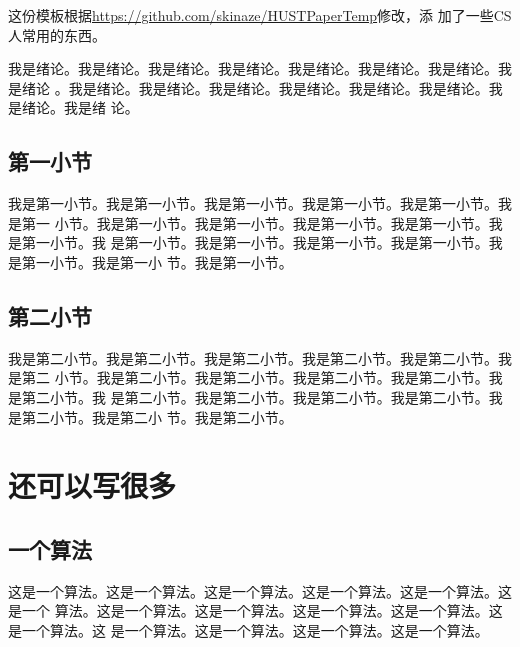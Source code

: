 \documentclass[supercite]{HustMasterReport}
\theoremstyle{definition}
\begin{document}
这份模板根据\url{https://github.com/skinaze/HUSTPaperTemp}\cite{ski17}修改，添
加了一些CS人常用的东西。

我是绪论。我是绪论。我是绪论。我是绪论。我是绪论。我是绪论。我是绪论。我是绪论
。我是绪论。我是绪论。我是绪论。我是绪论。我是绪论。我是绪论。我是绪论。我是绪
论。

\subsection{第一小节}

我是第一小节。我是第一小节。我是第一小节。我是第一小节。我是第一小节。我是第一
小节。我是第一小节。我是第一小节。我是第一小节。我是第一小节。我是第一小节。我
是第一小节。我是第一小节。我是第一小节。我是第一小节。我是第一小节。我是第一小
节。我是第一小节。

\subsection{第二小节}

我是第二小节。我是第二小节。我是第二小节。我是第二小节。我是第二小节。我是第二
小节。我是第二小节。我是第二小节。我是第二小节。我是第二小节。我是第二小节。我
是第二小节。我是第二小节。我是第二小节。我是第二小节。我是第二小节。我是第二小
节。我是第二小节。

\section{还可以写很多}

\subsection{一个算法}

这是一个算法。这是一个算法。这是一个算法。这是一个算法。这是一个算法。这是一个
算法。这是一个算法。这是一个算法。这是一个算法。这是一个算法。这是一个算法。这
是一个算法。这是一个算法。这是一个算法。这是一个算法。
\end{document}
